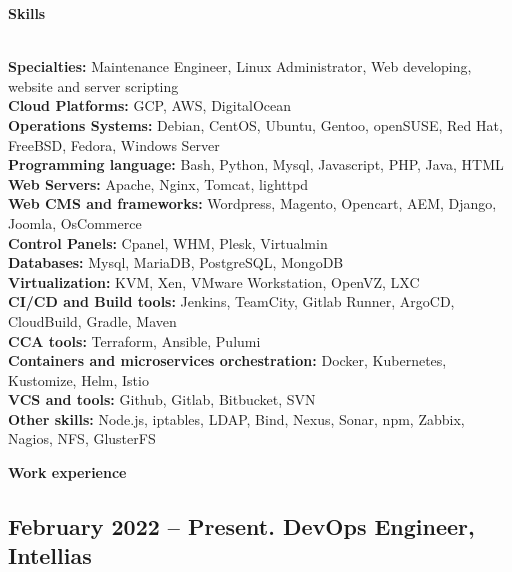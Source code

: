 \documentclass[letterpaper]{article}
\renewcommand{\section}[1]{
  {
    \large \colorbox{my-gray}{
      \begin{minipage}
        {\textwidth-0.175in}
        {\textbf{#1 \vphantom{p\^{E}}}}
      \end{minipage}
    }
  }
}
\begin{document}
\section{Skills}
\label{sec-1}\\
\label{sec-1-1}
\textbf{Specialties:} Maintenance Engineer, Linux Administrator, Web developing, website and server scripting\\
\label{sec-1-2}
\textbf{Cloud Platforms:} GCP, AWS, DigitalOcean\\
\label{sec-1-3}
\textbf{Operations Systems:} Debian, CentOS, Ubuntu, Gentoo, openSUSE, Red Hat, FreeBSD, Fedora, Windows Server\\
\label{sec-1-4}
\textbf{Programming language:} Bash, Python, Mysql, Javascript, PHP, Java, HTML\\
\label{sec-1-5}
\textbf{Web Servers:} Apache, Nginx, Tomcat, lighttpd\\
\label{sec-1-6}
\textbf{Web CMS and frameworks:} Wordpress, Magento, Opencart, AEM, Django, Joomla, OsCommerce\\
\label{sec-1-7}
\textbf{Control Panels:} Cpanel, WHM, Plesk, Virtualmin\\
\label{sec-1-8}
\textbf{Databases:} Mysql, MariaDB, PostgreSQL, MongoDB\\
\label{sec-1-10}
\textbf{Virtualization:} KVM, Xen, VMware Workstation, OpenVZ, LXC\\
\label{sec-1-11}
\textbf{CI/CD and Build tools:} Jenkins, TeamCity, Gitlab Runner, ArgoCD, CloudBuild, Gradle, Maven\\
\label{sec-1-12}
\textbf{CCA tools:} Terraform, Ansible, Pulumi\\
\label{sec-1-13}
\textbf{Containers and microservices orchestration:} Docker, Kubernetes, Kustomize, Helm, Istio\\
\label{sec-1-14}
\textbf{VCS and tools:} Github, Gitlab, Bitbucket, SVN\\
\label{sec-1-15}
\textbf{Other skills:}  Node.js, iptables, LDAP, Bind, Nexus, Sonar, npm, Zabbix, Nagios, NFS, GlusterFS\\
\section{Work experience}
\label{sec-2}

\subsection{{February 2022 – Present}. DevOps Engineer, Intellias}
\label{sec-2-1}
\end{document}
